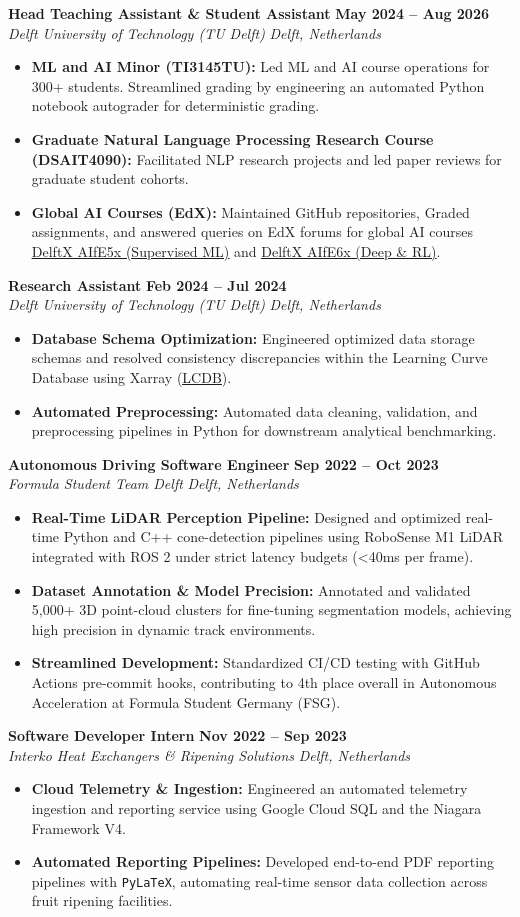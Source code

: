 \documentclass[letterpaper,11pt]{article}
\newcommand{\resumeSubheading}[4]{
  \vspace{-2pt}\item
    \textbf{\large#1} \hfill \textbf{\normalsize#2}\\
    \textit{\normalsize#3} \hfill \textit{\small#4}
  \vspace{-7pt}
}
\newcommand{\resumeItem}[1]{
  \item\normalsize{#1}
}
\newcommand{\resumeItemListStart}{\begin{itemize}[leftmargin=0.15in, topsep=1.5pt, itemsep=1.5pt, parsep=0pt]}
\newcommand{\resumeItemListEnd}{\end{itemize}}
\begin{document}
\resumeSubheading
{Head Teaching Assistant \& Student Assistant}{May 2024 -- Aug 2026}
{Delft University of Technology (TU Delft)}{Delft, Netherlands}
\resumeItemListStart
\resumeItem{\textbf{ML and AI Minor (TI3145TU):} Led ML and AI course operations for 300+ students. Streamlined grading by engineering an automated Python notebook autograder for deterministic grading.}
\resumeItem{\textbf{Graduate Natural Language Processing Research Course (DSAIT4090):} Facilitated NLP research projects and led paper reviews for graduate student cohorts.}
\resumeItem{\textbf{Global AI Courses (EdX):} Maintained GitHub repositories, Graded assignments, and answered queries on EdX forums for global AI courses \href{https://www.edx.org/learn/artificial-intelligence/delft-university-of-technology-ai-skills-for-engineers-supervised-machine-learning}{\color{linkblue}\underline{DelftX AIfE5x (Supervised ML)}} and \href{https://www.edx.org/learn/artificial-intelligence/delft-university-of-technology-ai-skills-introduction-to-unsupervised-deep-and-reinforcement-learning}{\color{linkblue}\underline{DelftX AIfE6x (Deep \& RL)}}.}
\resumeItemListEnd
\vspace{-5pt}
\resumeSubheading
{Research Assistant}{Feb 2024 -- Jul 2024}
{Delft University of Technology (TU Delft)}{Delft, Netherlands}
\resumeItemListStart
\resumeItem{\textbf{Database Schema Optimization:} Engineered optimized data storage schemas and resolved consistency discrepancies within the Learning Curve Database using Xarray (\href{https://doi.org/10.1007/978-3-031-26419-1_1}{\color{linkblue}\underline{LCDB}}).}
\resumeItem{\textbf{Automated Preprocessing:} Automated data cleaning, validation, and preprocessing pipelines in Python for downstream analytical benchmarking.}
\resumeItemListEnd
\vspace{-5pt}
\resumeSubheading
{Autonomous Driving Software Engineer}{Sep 2022 -- Oct 2023}
{Formula Student Team Delft}{Delft, Netherlands}
\resumeItemListStart
\resumeItem{\textbf{Real-Time LiDAR Perception Pipeline:} Designed and optimized real-time Python and C++ cone-detection pipelines using RoboSense M1 LiDAR integrated with ROS 2 under strict latency budgets (<40ms per frame).}
\resumeItem{\textbf{Dataset Annotation \& Model Precision:} Annotated and validated 5,000+ 3D point-cloud clusters for fine-tuning segmentation models, achieving high precision in dynamic track environments.}
\resumeItem{\textbf{Streamlined Development:} Standardized CI/CD testing with GitHub Actions pre-commit hooks, contributing to 4th place overall in Autonomous Acceleration at Formula Student Germany (FSG).}
\resumeItemListEnd
\vspace{-5pt}
\resumeSubheading
{Software Developer Intern}{Nov 2022 -- Sep 2023}
{Interko Heat Exchangers \& Ripening Solutions}{Delft, Netherlands}
\resumeItemListStart
\resumeItem{\textbf{Cloud Telemetry \& Ingestion:} Engineered an automated telemetry ingestion and reporting service using Google Cloud SQL and the Niagara Framework V4.}
\resumeItem{\textbf{Automated Reporting Pipelines:} Developed end-to-end PDF reporting pipelines with \texttt{PyLaTeX}, automating real-time sensor data collection across fruit ripening facilities.}
\resumeItemListEnd
\vspace{-5pt}
\end{document}
